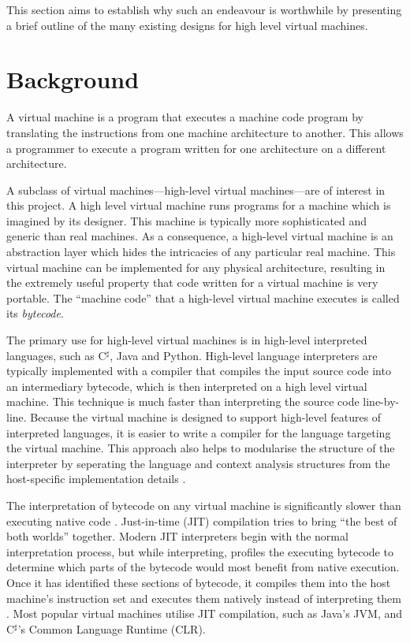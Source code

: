 	This section aims to establish why such an endeavour is worthwhile by presenting a brief outline of the many existing designs for high level virtual machines.
	
	\section{Background}
		A virtual machine is a program that executes a machine code program by translating the instructions from one machine architecture to another. This allows a programmer to execute a program written for one architecture on a different architecture.
		
		A subclass of virtual machines---high-level virtual machines---are of interest in this project. A high level virtual machine runs programs for a machine which is imagined by its designer. This machine is typically more sophisticated and generic than real machines. As a consequence, a high-level virtual machine is an abstraction layer which hides the intricacies of any particular real machine. This virtual machine can be implemented for any physical architecture, resulting in the extremely useful property that code written for a virtual machine is very portable. The ``machine code'' that a high-level virtual machine executes is called its \emph{bytecode}. 
		
		The primary use for high-level virtual machines is in high-level interpreted languages, such as C$^\sharp$, Java and Python. High-level language interpreters are typically implemented with a compiler that compiles the input source code into an intermediary bytecode, which is then interpreted on a high level virtual machine. This technique is much faster than interpreting the source code line-by-line. Because the virtual machine is designed to support high-level features of interpreted languages, it is easier to write a compiler for the language targeting the virtual machine. This approach also helps to modularise the structure of the interpreter by seperating the language and context analysis structures from the host-specific implementation details \citep{structureinterpreters}.
		
		The interpretation of bytecode on any virtual machine is significantly slower than executing native code \citep{optimizingindirectbranch}. Just-in-time (JIT) compilation tries to bring ``the best of both worlds'' together. Modern JIT interpreters begin with the normal interpretation process, but while interpreting, profiles the executing bytecode to determine which parts of the bytecode would most benefit from native execution. Once it has identified these sections of bytecode, it compiles them into the host machine's instruction set and executes them natively instead of interpreting them \citep{historyjit}. Most popular virtual machines utilise JIT compilation, such as Java's JVM, and C$^\sharp$'s Common Language Runtime (CLR).
		
